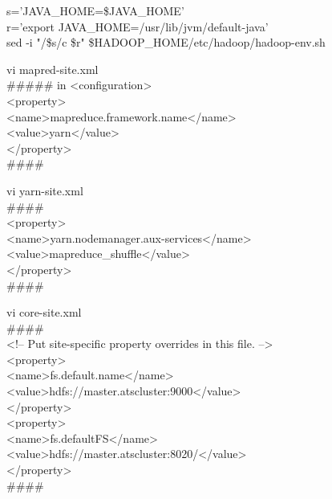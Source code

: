 \documentclass[a4paper]{article}
\begin{document}
\begin{center}
\begin{tcolorbox}[width=0.8\linewidth,colframe=black!5!white]
s='JAVA\_HOME=\${JAVA\_HOME}'
\\r='export JAVA\_HOME=/usr/lib/jvm/default-java'
\\sed -i "/\$s/c \$r" \$HADOOP\_HOME/etc/hadoop/hadoop-env.sh
\end{tcolorbox}
\end{center}


\begin{center}
\begin{tcolorbox}[width=0.8\linewidth,colframe=black!5!white]
vi mapred-site.xml
\\\#\#\#\#\# in <configuration>
\\ <property>
\\ <name>mapreduce.framework.name</name>
\\ <value>yarn</value>
\\ </property>
\\\#\#\#\#
\end{tcolorbox}
\end{center}

\begin{center}
\begin{tcolorbox}[width=0.8\linewidth,colframe=black!5!white]
vi yarn-site.xml
\\\#\#\#\#
\\<property>
\\<name>yarn.nodemanager.aux-services</name>
\\<value>mapreduce\_shuffle</value>
\\</property>
\\\#\#\#\#
\end{tcolorbox}
\end{center}

\begin{center}
\begin{tcolorbox}[width=0.8\linewidth,colframe=black!5!white]
vi core-site.xml
\\\#\#\#\#
\\<!-- Put site-specific property overrides in this file. -->
\\ <property>
\\  <name>fs.default.name</name>
\\  <value>hdfs://master.atscluster:9000</value>
\\ </property>
\\  <property>
\\  <name>fs.defaultFS</name>
\\  <value>hdfs://master.atscluster:8020/</value>
\\ </property>
\\\#\#\#\#
\end{tcolorbox}
\end{center}
\end{document}
